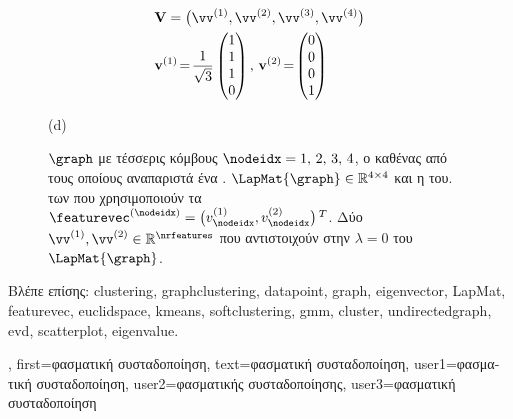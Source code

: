 {{\begin{figure}[H]
\begin{center}
\begin{minipage}{0.4\textwidth}
					\begin{align}
					& \mathbf{V} = \big( \vv^{(1)},\vv^{(2)},\vv^{(3)},\vv^{(4)} \big) \nonumber \\
					&	\mathbf{v}^{(1)}\!=\!\frac{1}{\sqrt{3}} \begin{pmatrix} 1 \\ 1 \\ 1 \\ 0 \end{pmatrix}, \,
					\mathbf{v}^{(2)}\!=\!\begin{pmatrix} 0 \\ 0 \\ 0 \\ 1 \end{pmatrix} \nonumber 
					\end{align}
					\begin{minipage}{\textwidth}
						\vspace{10ex}
						\centering
						{\selectfont (d)}
					\end{minipage}
				\end{minipage} 
		{
		\caption{\label{fig_lap_mtx_specclustering_dict}   $\graph$ 
			\foreignlanguage{greek}{με τέσσερις κόμβους $\nodeidx=1,\,2,\,3,\,4$, ο καθένας από τους οποίους αναπαριστά ένα} 
			.   
			$\LapMat{\graph} \in \mathbb{R}^{4 \times 4}$ \foreignlanguage{greek}{και η}  
			\foreignlanguage{greek}{του}.   \foreignlanguage{greek}{των} 
			 \foreignlanguage{greek}{που χρησιμοποιούν τα}  
			$\featurevec^{(\nodeidx)} = \big( v^{(1)}_{\nodeidx},v^{(2)}_{\nodeidx} \big)\,^{T}$. 
			 \foreignlanguage{greek}{Δύο}  
			$\vv^{(1)},\vv^{(2)} \in \mathbb{R}^{\nrfeatures}$ \foreignlanguage{greek}{που αντιστοιχούν στην} 
			 $\lambda=0$ \foreignlanguage{greek}{του}  $\LapMat{\graph}$. } }
			\end{center}
		\end{figure}
		\newpage
		\foreignlanguage{greek}{Βλέπε επίσης:} \gls{clustering}, \gls{graphclustering}, \gls{datapoint}, \gls{graph}, \gls{eigenvector}, \gls{LapMat}, 
		\gls{featurevec}, \gls{euclidspace}, \gls{kmeans}, \gls{softclustering}, \gls{gmm}, \gls{cluster}, \gls{undirectedgraph}, \gls{evd}, 
		\gls{scatterplot}, \gls{eigenvalue}.}, 
	first={\foreignlanguage{greek}{φασματική συσταδοποίηση}},
	text={\foreignlanguage{greek}{φασματική συσταδοποίηση}},
	user1={\foreignlanguage{greek}{φασματική συσταδοποίηση}}, %
    	user2={\foreignlanguage{greek}{φασματικής συσταδοποίησης}}, %
	user3={\foreignlanguage{greek}{φασματική συσταδοποίηση}} %
}

